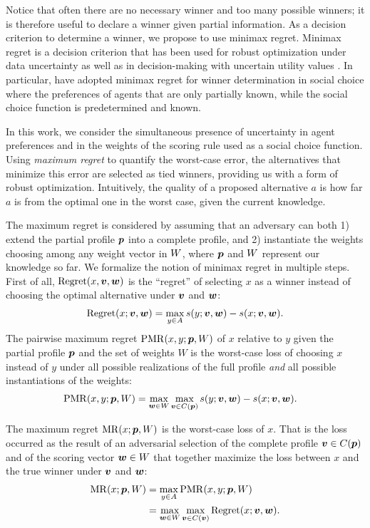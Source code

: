 \documentclass[sigconf, anonymous]{aamas}
\begin{document}
Notice that often there are no necessary winner and too many possible winners; it is therefore useful to declare a winner given partial information.
As a decision criterion to determine a winner, we propose to use minimax regret. 
Minimax regret \citep{Savage1954} is a decision criterion that has been used for robust optimization under data uncertainty \citep{Kouvelis1997} as well as in decision-making with uncertain utility values \citep{Salo2001,Boutilier2006}.
In particular, \citet{Lu2011} have adopted minimax regret for winner determination in social choice where
the preferences of agents that are only partially known, while the social choice function is predetermined and known.

In this work, we consider the simultaneous presence of uncertainty in agent preferences and in the weights of the scoring rule used as a social choice function.
Using {\em maximum regret} to quantify the worst-case error, the alternatives that minimize this error are selected as tied winners, providing us with a form of robust optimization.
Intuitively, the quality of a proposed alternative $a$ is how far $a$ is from the optimal one in the worst case, given the current knowledge.

The maximum regret is considered by assuming that an adversary can both 1) extend the partial profile ${\bm{p}}$ into a complete profile, and 2) instantiate the weights choosing among any weight vector in $W$, where ${\bm{p}}$ and $W$ represent our knowledge so far.
We formalize the notion of minimax regret in multiple steps.
First of all, $\operatorname{Regret}(x, \bm{v}, \bm{w})$ is the “regret” of selecting $x$ as a winner instead of choosing the optimal alternative under $\bm{v}$ and $\bm{w}$:
\begin{align} 
	\operatorname{Regret}(x; \bm{v}, \bm{w}) = \max_{y \in A} s(y; \bm{v},\bm{w}) - s(x; \bm{v}, \bm{w}).
\end{align}
The pairwise maximum regret $\operatorname{PMR}(x,y;{\bm{p}},W)$ of $x$ relative to $y$ given the partial profile ${\bm{p}}$ and the set of weights $W$
is the worst-case loss of choosing $x$ instead of $y$ under all possible realizations of the full profile {\em and} all possible instantiations of the weights:
\begin{align}
	\operatorname{PMR}(x,y; {\bm{p}}, W) & = \max_{\bm{w} \in W} \max_{\bm{v} \in C({\bm{p}})} s(y; \bm{v},\bm{w}) - s(x; \bm{v},\bm{w}).
\end{align}

The maximum regret $\operatorname{MR}(x;{\bm{p}},W)$ is the worst-case loss of $x$. That is the loss occurred as the result of an adversarial selection of the complete profile $\bm{v} \in C({\bm{p}})$ and of the scoring vector $\bm{w} \in W$ that together maximize the loss between $x$ and the true winner under $\bm{v}$ and $\bm{w}$:
\begin{align}
	\operatorname{MR}(x; {\bm{p}}, W) & = \max_{y \in A} \operatorname{PMR}(x,y; {\bm{p}}, W)\\
	& = \max_{\bm{w} \in W} \max_{\bm{v} \in C(\bm{v})} \operatorname{Regret}(x; \bm{v}, \bm{w}).
\end{align}
\end{document}
